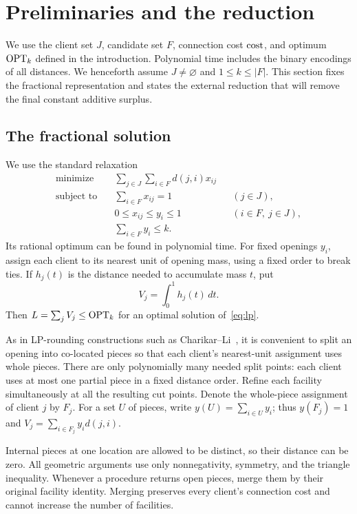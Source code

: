 \section{Preliminaries and the reduction}\label{sec:preliminaries}

We use the client set \(J\), candidate set \(F\), connection cost
\(\operatorname{cost}\), and optimum \(\operatorname{OPT}_k\) defined in the introduction.
Polynomial time includes the binary encodings of all distances.
We henceforth assume \(J\ne\varnothing\) and \(1\le k\le |F|\).
This section fixes the fractional representation and states the external
reduction that will remove the final constant additive surplus.

\subsection{The fractional solution}

We use the standard relaxation
\begin{equation}\label{eq:lp}
\begin{aligned}
 \text{minimize}\quad &\sum_{j\in J}\sum_{i\in F}d(j,i)x_{ij}\\
 \text{subject to}\quad&
 \sum_{i\in F}x_{ij}=1 &&(j\in J),\\
 &0\le x_{ij}\le y_i\le1 &&(i\in F,\ j\in J),\\
 &\sum_{i\in F}y_i\le k.
\end{aligned}
\end{equation}
Its rational optimum can be found in polynomial time. For fixed openings
\(y_i\), assign each client to its nearest unit of opening mass, using a fixed
order to break ties. If \(h_j(t)\) is the distance needed to accumulate mass
\(t\), put
\[
 V_j=\int_0^1h_j(t)\,dt.
\]
Then \(L=\sum_jV_j\le\operatorname{OPT}_k\) for an optimal solution of~\eqref{eq:lp}.

As in LP-rounding constructions such as Charikar--Li~\cite[Section~2]{CharikarLi2012},
it is convenient to split an opening into co-located pieces so that each
client's nearest-unit assignment uses whole pieces. There are only
polynomially many needed split points: each client uses at most one partial
piece in a fixed distance order. Refine each facility simultaneously at all
the resulting cut points. Denote the whole-piece assignment of client \(j\)
by \(F_j\). For a set \(U\) of pieces, write \(y(U)=\sum_{i\in U}y_i\);
thus \(y(F_j)=1\) and \(V_j=\sum_{i\in F_j}y_id(j,i)\).

Internal pieces at one location are allowed to be distinct, so their distance
can be zero. All geometric arguments use only nonnegativity, symmetry, and
the triangle inequality. Whenever a procedure returns open pieces, merge
them by their original facility identity. Merging preserves every client's
connection cost and cannot increase the number of facilities.

